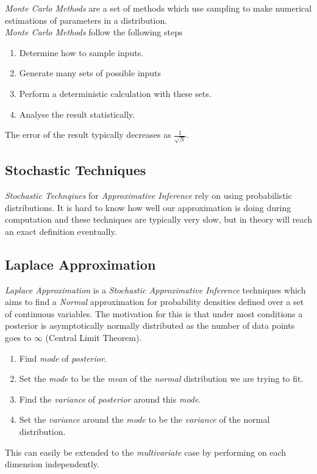 \documentclass[11pt,a4paper]{article}
\begin{document}
\textit{Monte Carlo Methods} are a set of methods which use sampling to make numerical estimations of parameters in a distribution.\\
\textit{Monte Carlo Methods} follow the following steps
\begin{enumerate}
	\item Determine how to sample inputs.
	\item Generate many sets of possible inputs
	\item Perform a deterministic calculation with these sets.
	\item Analyse the result statistically.
\end{enumerate}
\nb The error of the result typically decreases as $\frac{1}{\sqrt{N}}$.

\subsection{Stochastic Techniques}

\textit{Stochastic Technqiues} for \textit{Approximative Inference} rely on using probabilistic distributions. It is hard to know how well our approximation is doing during computation and these techniques are typically very slow, but in theory will reach an exact definition eventually.

\subsection{Laplace Approximation}

\textit{Laplace Approximation} is a \textit{Stochastic Approximative Inference} techniques which aims to find a \textit{Normal} approximation for probability densities defined over a set of continuous variables. The motivation for this is that under most conditions a posterior is asymptotically normally distributed as the number of data points goes to $\infty$ (Central Limit Theorem).\\

\begin{enumerate}
	\item Find \textit{mode} of \textit{posterior}.
	\item Set the \textit{mode} to be the \textit{mean} of the \textit{normal} distribution we are trying to fit.
	\item Find the \textit{variance} of \textit{posterior} around this \textit{mode}.
	\item Set the \textit{variance} around the \textit{mode} to be the \textit{variance} of the normal distribution.
\end{enumerate}
\nb This can easily be extended to the \textit{multivariate} case by performing on each dimension independently.\\
\end{document}
